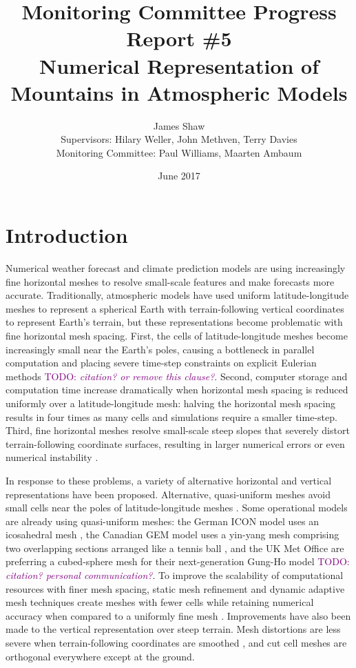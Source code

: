 \documentclass[a4paper,11pt]{article}
\title{
\vspace*{-2em}
Monitoring Committee Progress Report \#5\\
\vspace*{1em}
\Large{Numerical Representation of Mountains in Atmospheric Models}}
\author{James Shaw
\vspace{0.5em} \\
\large{Supervisors: Hilary Weller, John Methven, Terry Davies}
\vspace{0.5em} \\
\large{Monitoring Committee: Paul Williams, Maarten Ambaum}}
\date{June 2017}
\newcommand{\TODO}[1]{\textcolor{purple}{TODO: \emph{#1}}}
\begin{document}
\maketitle

\section{Introduction}

Numerical weather forecast and climate prediction models are using increasingly fine horizontal meshes to resolve small-scale features and make forecasts more accurate.  Traditionally, atmospheric models have used uniform latitude-longitude meshes to represent a spherical Earth with terrain-following vertical coordinates to represent Earth's terrain, but these representations become problematic with fine horizontal mesh spacing.
First, the cells of latitude-longitude meshes become increasingly small near the Earth's poles, causing a bottleneck in parallel computation \citep{staniforth-thuburn2012} and placing severe time-step constraints on explicit Eulerian methods \TODO{citation? or remove this clause?}.
Second, computer storage and computation time increase dramatically when horizontal mesh spacing is reduced uniformly over a latitude-longitude mesh: halving the horizontal mesh spacing results in four times as many cells and simulations require a smaller time-step.
Third, fine horizontal meshes resolve small-scale steep slopes that severely distort terrain-following coordinate surfaces, resulting in larger numerical errors \citep{schaer2002} or even numerical instability \citep{webster2003}.

In response to these problems, a variety of alternative horizontal and vertical representations have been proposed.  Alternative, quasi-uniform meshes avoid small cells near the poles of latitude-longitude meshes \citep{staniforth-thuburn2012}.  Some operational models are already using quasi-uniform meshes: the German ICON model uses an icosahedral mesh \citep{wan2013}, the Canadian GEM model uses a yin-yang mesh comprising two overlapping sections arranged like a tennis ball \citep{qaddouri2011}, and the UK Met Office are preferring a cubed-sphere mesh for their next-generation Gung-Ho model \TODO{citation? personal communication?}.
To improve the scalability of computational resources with finer mesh spacing, static mesh refinement and dynamic adaptive mesh techniques create meshes with fewer cells while retaining numerical accuracy when compared to a uniformly fine mesh \citep{jablonowski2009}.
Improvements have also been made to the vertical representation over steep terrain.  Mesh distortions are less severe when terrain-following coordinates are smoothed \citep{leuenberger2010,klemp2011}, and cut cell meshes are orthogonal everywhere except at the ground.
\end{document}
